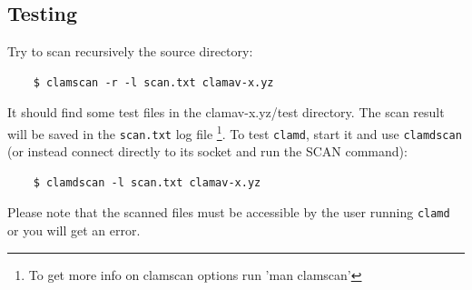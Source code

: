 \documentclass[a4paper,titlepage,12pt]{article}
\begin{document}
    \subsection{Testing}
    Try to scan recursively the source directory:
    \begin{verbatim}
	$ clamscan -r -l scan.txt clamav-x.yz
    \end{verbatim}
    It should find some test files in the clamav-x.yz/test directory.
    The scan result will be saved in the \verb+scan.txt+ log file
    \footnote{To get more info on clamscan options run 'man clamscan'}.
    To test \verb+clamd+, start it and use \verb+clamdscan+ (or instead connect
    directly to its socket and run the SCAN command):
    \begin{verbatim}
	$ clamdscan -l scan.txt clamav-x.yz
    \end{verbatim}
    Please note that the scanned files must be accessible by the user running
    \verb+clamd+ or you will get an error.
\end{document}
